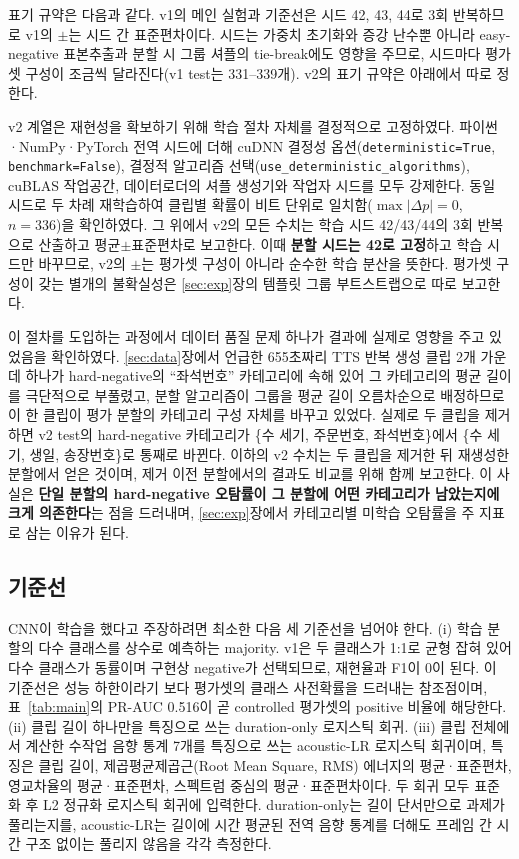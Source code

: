 \documentclass[11pt]{article}
\renewcommand{\emph}[1]{\textbf{#1}}
\begin{document}
표기 규약은 다음과 같다. v1의 메인 실험과 기준선은 시드 42, 43, 44로 3회 반복하므로 v1의
$\pm$는 시드 간 표준편차이다. 시드는 가중치 초기화와 증강 난수뿐 아니라 easy-negative
표본추출과 분할 시 그룹 셔플의 tie-break에도 영향을 주므로, 시드마다 평가셋 구성이 조금씩
달라진다(v1 test는 331--339개). v2의 표기 규약은 아래에서 따로 정한다.

v2 계열은 재현성을 확보하기 위해 학습 절차 자체를 결정적으로 고정하였다. 파이썬·NumPy·PyTorch
전역 시드에 더해 cuDNN 결정성 옵션(\texttt{deterministic=True}, \texttt{benchmark=False}),
결정적 알고리즘 선택(\texttt{use\_deterministic\_algorithms}), cuBLAS 작업공간, 데이터로더의
셔플 생성기와 작업자 시드를 모두 강제한다. 동일 시드로 두 차례 재학습하여 클립별 확률이 비트
단위로 일치함($\max|\Delta p| = 0$, $n=336$)을 확인하였다. 그 위에서 v2의 모든 수치는 학습 시드
42/43/44의 3회 반복으로 산출하고 평균$\pm$표준편차로 보고한다. 이때 \emph{분할 시드는 42로
고정}하고 학습 시드만 바꾸므로, v2의 $\pm$는 평가셋 구성이 아니라 순수한 학습 분산을 뜻한다.
평가셋 구성이 갖는 별개의 불확실성은 \ref{sec:exp}장의 템플릿 그룹 부트스트랩으로 따로 보고한다.

이 절차를 도입하는 과정에서 데이터 품질 문제 하나가 결과에 실제로 영향을 주고 있었음을
확인하였다. \ref{sec:data}장에서 언급한 655초짜리 TTS 반복 생성 클립 2개 가운데 하나가
hard-negative의 ``좌석번호'' 카테고리에 속해 있어 그 카테고리의 평균 길이를 극단적으로
부풀렸고, 분할 알고리즘이 그룹을 평균 길이 오름차순으로 배정하므로 이 한 클립이 평가 분할의
카테고리 구성 자체를 바꾸고 있었다. 실제로 두 클립을 제거하면 v2 test의 hard-negative
카테고리가 \{수 세기, 주문번호, 좌석번호\}에서 \{수 세기, 생일, 송장번호\}로 통째로 바뀐다.
이하의 v2 수치는 두 클립을 제거한 뒤 재생성한 분할에서 얻은 것이며, 제거 이전 분할에서의
결과도 비교를 위해 함께 보고한다. 이 사실은 \emph{단일 분할의 hard-negative 오탐률이 그
분할에 어떤 카테고리가 남았는지에 크게 의존한다}는 점을 드러내며, \ref{sec:exp}장에서
카테고리별 미학습 오탐률을 주 지표로 삼는 이유가 된다.

\subsection{기준선}
CNN이 학습을 했다고 주장하려면 최소한 다음 세 기준선을 넘어야 한다. (i) 학습 분할의 다수
클래스를 상수로 예측하는 majority. v1은 두 클래스가 1:1로 균형 잡혀 있어 다수 클래스가
동률이며 구현상 negative가 선택되므로, 재현율과 F1이 0이 된다. 이 기준선은 성능 하한이라기
보다 평가셋의 클래스 사전확률을 드러내는 참조점이며, 표~\ref{tab:main}의 PR-AUC 0.516이 곧
controlled 평가셋의 positive 비율에 해당한다. (ii) 클립 길이 하나만을 특징으로 쓰는
duration-only 로지스틱 회귀. (iii) 클립 전체에서 계산한 수작업 음향 통계 7개를 특징으로 쓰는
acoustic-LR 로지스틱 회귀이며, 특징은 클립 길이, 제곱평균제곱근(Root Mean Square, RMS) 에너지의 평균·표준편차, 영교차율의
평균·표준편차, 스펙트럼 중심의 평균·표준편차이다. 두 회귀 모두 표준화 후 L2 정규화
로지스틱 회귀에 입력한다. duration-only는 길이 단서만으로 과제가 풀리는지를, acoustic-LR는
길이에 시간 평균된 전역 음향 통계를 더해도 프레임 간 시간 구조 없이는 풀리지 않음을 각각
측정한다.
\end{document}
